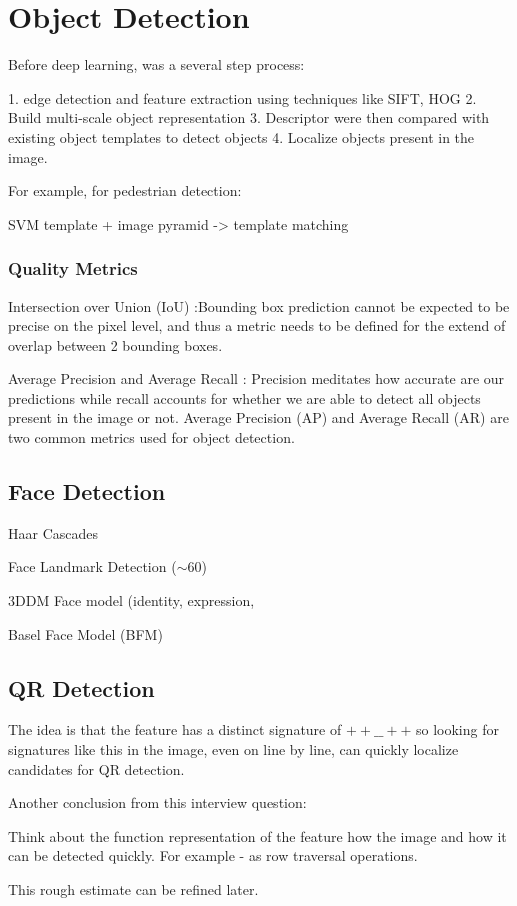 \section{Object Detection}

Before deep learning, was a several step process: 

1. edge detection and feature extraction using techniques like SIFT, HOG 
2. Build multi-scale object representation
3. Descriptor were then compared with existing object templates to detect objects
4. Localize objects present in the image.

For example, for pedestrian detection:

SVM template + image pyramid -> template matching

\subsubsection{Quality Metrics}

Intersection over Union (IoU) :Bounding box prediction cannot be expected to be precise on the pixel level, and thus a metric needs to be defined for the extend of overlap between 2 bounding boxes.

Average Precision and Average Recall : Precision meditates how accurate are our predictions while recall accounts for whether we are able to detect all objects present in the image or not. Average Precision (AP) and Average Recall (AR) are two common metrics used for object detection.

\subsection{Face Detection}

Haar Cascades

Face Landmark Detection ($\sim 60$)

3DDM Face model (identity, expression,

Basel Face Model (BFM)

\subsection{QR Detection}

The idea is that the feature has a distinct signature of $++\_\_++$ so looking for signatures like this in the image, even on line by line, can quickly localize candidates for QR detection. 

Another conclusion from this interview question: 

Think about the function representation of the feature how the image and how it can be detected quickly. For example - as row traversal operations.

This rough estimate can be refined later.


